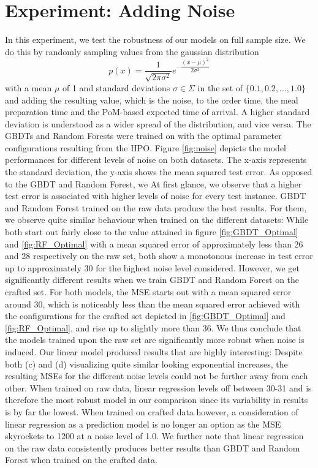 \section{Experiment: Adding Noise}\label{sec:noise}
In this experiment, we test the robustness of our models on full sample size. We do this by randomly sampling values from the gaussian distribution
\begin{equation}
	p(x) = \dfrac{1}{\sqrt{2\pi\sigma^{2}}} e^{-\dfrac{(x-\mu)^2}{2\sigma^2}}
\end{equation}
with a mean $ \mu $ of 1 and standard deviations $ \sigma \in \Sigma $ in the set of $ \{0.1, 0.2, \dots, 1.0\} $ and adding the resulting value, which is the noise, to the order time, the meal preparation time and the PoM-based expected time of arrival. A higher standard deviation is understood as a wider spread of the distribution, and vice versa. The GBDTs and Random Forests were trained on with the optimal parameter configurations resulting from the HPO. Figure \ref{fig:noise} depicts the model performances for different levels of noise on both datasets. The x-axis represents the standard deviation, the y-axis shows the mean squared test error. As opposed to the GBDT and Random Forest, we  At first glance, we observe that a higher test error is associated with higher levels of noise for every test instance. GBDT and Random Forest trained on the raw data produce the best results. For them, we observe quite similar behaviour when trained on the different datasets: While both start out fairly close to the value attained in figure \ref{fig:GBDT_Optimal} and \ref{fig:RF_Optimal} with a mean squared error of approximately less than 26 and 28 respectively on the raw set, both show a monotonous increase in test error up to approximately 30 for the highest noise level considered. However, we get significantly different results when we train GBDT and Random Forest on the crafted set. For both models, the MSE starts out with a mean squared error around 30, which is noticeably less than the mean squared error achieved with the configurations for the crafted set depicted in \ref{fig:GBDT_Optimal} and \ref{fig:RF_Optimal}, and rise up to slightly more than 36. We thus conclude that the models trained upon the raw set are significantly more robust when noise is induced. Our linear model produced results that are highly interesting: Despite both (c) and (d) visualizing quite similar looking exponential increases, the resulting MSEs for the different noise levels could not be further away from each other. When trained on raw data, linear regression levels off between 30-31 and is therefore the most robust model in our comparison since its variability in results is by far the lowest. When trained on crafted data however, a consideration of linear regression as a prediction model is no longer an option as the MSE skyrockets to 1200 at a noise level of 1.0. We further note that linear regression on the raw data consistently produces better results than GBDT and Random Forest when trained on the crafted data. 
